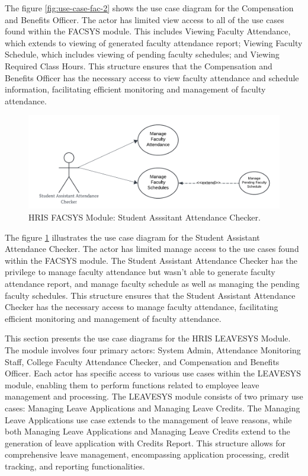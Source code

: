     The figure \ref{fig:use-case-fac-2} shows the use case diagram for the Compensation and Benefits Officer. The actor has limited view access to all of the use cases found within the FACSYS module. This includes Viewing Faculty Attendance, which extends to viewing of generated faculty attendance report; Viewing Faculty Schedule, which includes viewing of pending faculty schedules; and Viewing Required Class Hours. This structure ensures that the Compensation and Benefits Officer has the necessary access to view faculty attendance and schedule information, facilitating efficient monitoring and management of faculty attendance.

    \begin{figure}[H]
        \centering
        \includegraphics[width=0.9\linewidth]{figures/images/diagrams/usecase/use-case-fac-3.png}
        \caption{HRIS FACSYS Module: Student Asssitant Attendance Checker.}
        \label{fig:use-case-fac-3}
    \end{figure}

    The figure \ref{fig:use-case-fac-3} illustrates the use case diagram for the Student Assistant Attendance Checker. The actor has limited manage access to the use cases found within the FACSYS module. The Student Assistant Attendance Checker has the privilege to manage faculty attendance but wasn't able to generate faculty attendance report, and manage faculty schedule as well as managing the pending faculty schedules. This structure ensures that the Student Assistant Attendance Checker has the necessary access to manage faculty attendance, facilitating efficient monitoring and management of faculty attendance. 
    

    This section presents the use case diagrams for the HRIS LEAVESYS Module. The module involves four primary actors: System Admin, Attendance Monitoring Staff, College Faculty Attendance Checker, and Compensation and Benefits Officer. Each actor has specific access to various use cases within the LEAVESYS module, enabling them to perform functions related to employee leave management and processing. The LEAVESYS module consists of two primary use cases: Managing Leave Applications and Managing Leave Credits. The Managing Leave Applications use case extends to the management of leave reasons, while both Managing Leave Applications and Managing Leave Credits extend to the generation of leave application with Credits Report. This structure allows for comprehensive leave management, encompassing application processing, credit tracking, and reporting functionalities.

